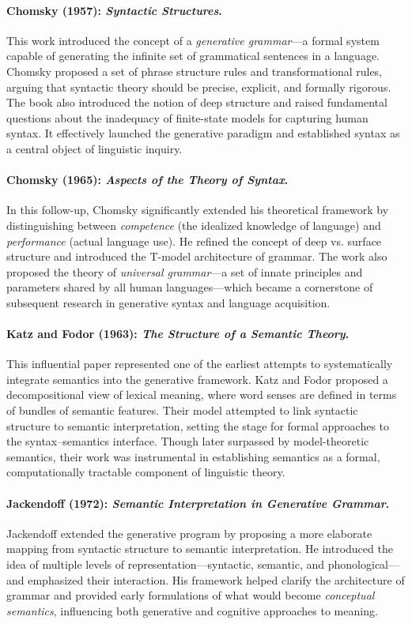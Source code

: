 \paragraph{Chomsky (1957): \textit{Syntactic Structures}.}
This work introduced the concept of a \emph{generative grammar}—a formal system capable of generating the infinite set of grammatical sentences in a language. Chomsky proposed a set of phrase structure rules and transformational rules, arguing that syntactic theory should be precise, explicit, and formally rigorous. The book also introduced the notion of deep structure and raised fundamental questions about the inadequacy of finite-state models for capturing human syntax. It effectively launched the generative paradigm and established syntax as a central object of linguistic inquiry.

\paragraph{Chomsky (1965): \textit{Aspects of the Theory of Syntax}.}
In this follow-up, Chomsky significantly extended his theoretical framework by distinguishing between \emph{competence} (the idealized knowledge of language) and \emph{performance} (actual language use). He refined the concept of deep vs. surface structure and introduced the T-model architecture of grammar. The work also proposed the theory of \emph{universal grammar}—a set of innate principles and parameters shared by all human languages—which became a cornerstone of subsequent research in generative syntax and language acquisition.

\paragraph{Katz and Fodor (1963): \textit{The Structure of a Semantic Theory}.}
This influential paper represented one of the earliest attempts to systematically integrate semantics into the generative framework. Katz and Fodor proposed a decompositional view of lexical meaning, where word senses are defined in terms of bundles of semantic features. Their model attempted to link syntactic structure to semantic interpretation, setting the stage for formal approaches to the syntax–semantics interface. Though later surpassed by model-theoretic semantics, their work was instrumental in establishing semantics as a formal, computationally tractable component of linguistic theory.

\paragraph{Jackendoff (1972): \textit{Semantic Interpretation in Generative Grammar}.}
Jackendoff extended the generative program by proposing a more elaborate mapping from syntactic structure to semantic interpretation. He introduced the idea of multiple levels of representation—syntactic, semantic, and phonological—and emphasized their interaction. His framework helped clarify the architecture of grammar and provided early formulations of what would become \emph{conceptual semantics}, influencing both generative and cognitive approaches to meaning.

